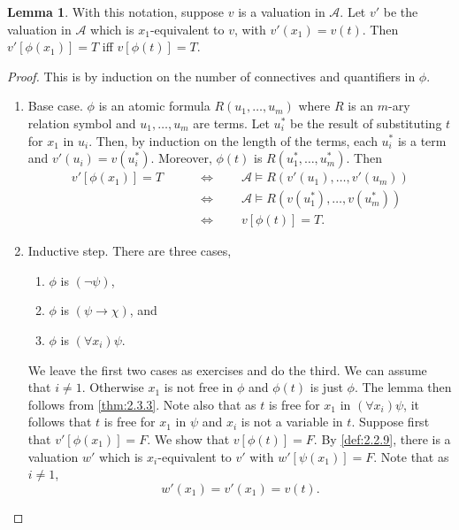 \documentclass{article}
\newcommand{\A}{\mathcal{A}}
\newcommand{\rb}[1]{\left( #1 \right)}
\renewcommand{\sb}[1]{\left[ #1 \right]}
\newcommand{\notb}[1]{\rb{\neg #1}}
\newcommand{\impb}[2]{\rb{#1 \rightarrow #2}}
\newcommand{\fab}[1]{\rb{\forall #1}}
\theoremstyle{definition}\newtheorem{definition}{Definition}[subsection]
\theoremstyle{definition}\newtheorem{remark}[definition]{Remark}
\theoremstyle{definition}\newtheorem*{example}{Example}
\theoremstyle{definition}\newtheorem*{note}{Note}
\newtheorem{lemma}[definition]{Lemma}
\begin{document}
\begin{lemma}
\label{lem:2.3.7}
With this notation, suppose $ v $ is a valuation in $ \A $. Let $ v' $ be the valuation in $ \A $ which is $ x_1 $-equivalent to $ v $, with $ v'\rb{x_1} = v\rb{t} $. Then $ v'\sb{\phi\rb{x_1}} = T $ iff $ v\sb{\phi\rb{t}} = T $.
\end{lemma}

\begin{proof}
This is by induction on the number of connectives and quantifiers in $ \phi $.
\begin{enumerate}
\item Base case. $ \phi $ is an atomic formula $ R\rb{u_1, \dots, u_m} $ where $ R $ is an $ m $-ary relation symbol and $ u_1, \dots, u_m $ are terms. Let $ u^*_i $ be the result of substituting $ t $ for $ x_1 $ in $ u_i $. Then, by induction on the length of the terms, each $ u_i^* $ is a term and $ v'\rb{u_i} = v\rb{u_i^*} $. Moreover, $ \phi\rb{t} $ is $ R\rb{u_1^*, \dots, u_m^*} $. Then
\begin{align*}
v'\sb{\phi\rb{x_1}} = T \qquad
& \iff \qquad \A \vDash R\rb{v'\rb{u_1}, \dots, v'\rb{u_m}} \\
& \iff \qquad \A \vDash R\rb{v\rb{u_1^*}, \dots, v\rb{u_m^*}} \\
& \iff \qquad v\sb{\phi\rb{t}} = T.
\end{align*}
\item Inductive step. There are three cases,
\begin{enumerate}
\item $ \phi $ is $ \notb{\psi} $,
\item $ \phi $ is $ \impb{\psi}{\chi} $, and
\item $ \phi $ is $ \fab{x_i}\psi $.
\end{enumerate}
We leave the first two cases as exercises and do the third. We can assume that $ i \ne 1 $. Otherwise $ x_1 $ is not free in $ \phi $ and $ \phi\rb{t} $ is just $ \phi $. The lemma then follows from \ref{thm:2.3.3}. Note also that as $ t $ is free for $ x_1 $ in $ \fab{x_i}\psi $, it follows that $ t $ is free for $ x_1 $ in $ \psi $ and $ x_i $ is not a variable in $ t $. Suppose first that $ v'\sb{\phi\rb{x_1}} = F $. We show that $ v\sb{\phi\rb{t}} = F $. By \ref{def:2.2.9}, there is a valuation $ w' $ which is $ x_i $-equivalent to $ v' $ with $ w'\sb{\psi\rb{x_1}} = F $. Note that as $ i \ne 1 $,
\begin{equation}
\label{eq:5}
w'\rb{x_1} = v'\rb{x_1} = v\rb{t}.
\end{equation}

\end{enumerate}
\end{proof}
\end{document}
